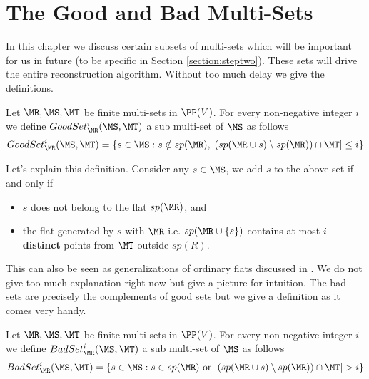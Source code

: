 \chapter{The Good and Bad Multi-Sets}\label{chapter:goodbadset}

In this chapter we discuss certain subsets of multi-sets which will be important for us in future (to be specific in 
Section \ref{section:steptwo}). These sets will drive the entire reconstruction algorithm. Without too much delay we give the
definitions.

\begin{definition}
 Let $\MR,\MS,\MT$ be finite multi-sets in $\PP(V)$. For every non-negative integer $i$ we define $GoodSet^i_\MR(\MS,\MT)$ a sub multi-set of $\MS$
 as follows
 \[
  GoodSet^i_\MR(\MS,\MT) = \{s\in \MS : s\notin sp(\MR), |(sp(\MR\cup {s})\setminus sp(\MR)) \cap \MT| \leq i \}
 \]

\end{definition}
Let's explain this definition. Consider any $s\in \MS$, we add $s$ to the above set if and only if
\begin{itemize}
  \renewcommand\labelitemi{--}

\item $s$ does not belong to the flat $sp(\MR)$, and
 \item the flat generated by $s$ with $\MR$ i.e. $sp(\MR\cup \{s\})$ contains at most $i$ \textbf{distinct} points from $\MT$ outside $sp(R)$.
\end{itemize}
This can also be seen as generalizations of ordinary flats discussed in \cite{BDWY11}. We do not give too much explanation right now but 
give a picture for intuition. The bad sets are precisely the complements of good sets but we give a definition as it
comes very handy.

\begin{definition}
 Let $\MR,\MS,\MT$ be finite multi-sets in $\PP(V)$. For every non-negative integer $i$ we define $BadSet^i_\MR(\MS,\MT)$ a sub multi-set 
 of $\MS$ as follows
 \[
  BadSet^i_\MR(\MS,\MT) = \{s\in \MS : s\in sp(\MR) \text{ or } |(sp(\MR\cup {s})\setminus sp(\MR)) \cap \MT| > i \}
 \]

\end{definition}

